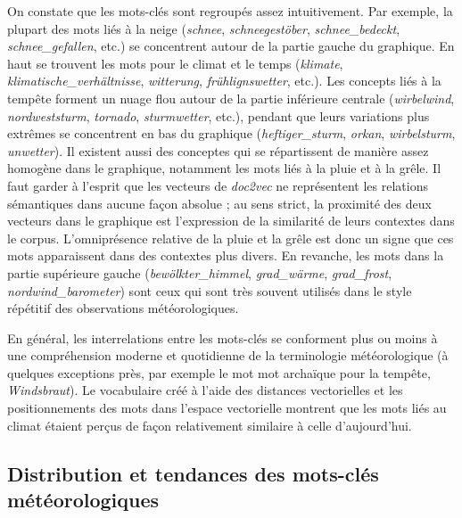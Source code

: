 \documentclass[a4paper,twoside,12pt]{article}
\begin{document}
On constate que les mots-clés sont regroupés assez intuitivement. Par exemple, la plupart des mots liés à la neige (\textit{schnee}, \textit{schneegestöber}, \textit{schnee\_bedeckt}, \textit{schnee\_gefallen}, etc.) se concentrent autour de la partie gauche du graphique. En haut se trouvent les mots pour le climat et le temps (\textit{klimate}, \textit{klimatische\_verhältnisse}, \textit{witterung}, \textit{frühlignswetter}, etc.). Les concepts liés à la tempête forment un nuage flou autour de la partie inférieure centrale (\textit{wirbelwind}, \textit{nordweststurm}, \textit{tornado}, \textit{sturmwetter}, etc.), pendant que leurs variations plus extrêmes se concentrent en bas du graphique (\textit{heftiger\_sturm}, \textit{orkan}, \textit{wirbelsturm}, \textit{unwetter}). Il existent aussi des conceptes qui se répartissent de manière assez homogène dans le graphique, notamment les mots liés à la pluie et à la grêle. Il faut garder à l'esprit que les vecteurs de \textit{doc2vec} ne représentent les relations sémantiques dans aucune façon absolue ; au sens strict, la proximité des deux vecteurs dans le graphique est l'expression de la similarité de leurs contextes dans le corpus. L'omniprésence relative de la pluie et la grêle est donc un signe que ces mots apparaissent dans des contextes plus divers. En revanche, les mots dans la partie supérieure gauche (\textit{bewölkter\_himmel}, \textit{grad\_wärme}, \textit{grad\_frost}, \textit{nordwind\_barometer}) sont ceux qui sont très souvent utilisés dans le style répétitif des observations météorologiques.

En général, les interrelations entre les mots-clés se conforment plus ou moins à une compréhension moderne et quotidienne de la terminologie météorologique (à quelques exceptions près, par exemple le mot mot archaïque pour la tempête, \textit{Windsbraut}). Le vocabulaire créé à l'aide des distances vectorielles et les positionnements des mots dans l'espace vectorielle montrent que les mots liés au climat étaient perçus de façon relativement similaire à celle d'aujourd'hui. 


\subsection{Distribution et tendances des mots-clés météorologiques}\label{entity_distribution}
\end{document}
